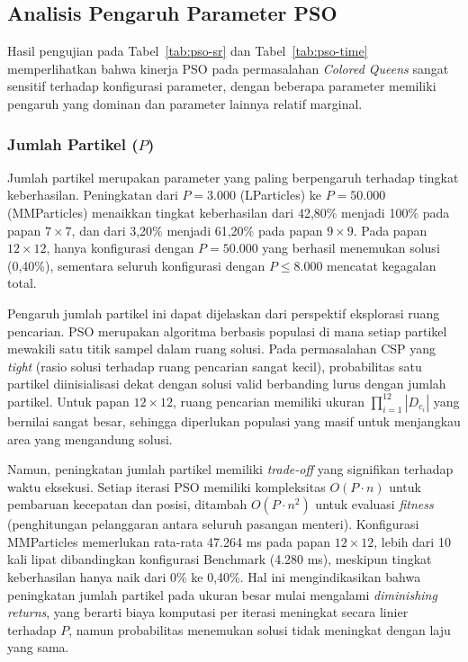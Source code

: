 \subsection{Analisis Pengaruh Parameter PSO}
\label{subsec:analisis-pso}

Hasil pengujian pada Tabel~\ref{tab:pso-sr} dan Tabel~\ref{tab:pso-time} memperlihatkan bahwa kinerja PSO pada permasalahan \textit{Colored Queens} sangat sensitif terhadap konfigurasi parameter, dengan beberapa parameter memiliki pengaruh yang dominan dan parameter lainnya relatif marginal.

\subsubsection{Jumlah Partikel ($P$)}

Jumlah partikel merupakan parameter yang paling berpengaruh terhadap tingkat keberhasilan. Peningkatan dari $P = 3.000$ (LParticles) ke $P = 50.000$ (MMParticles) menaikkan tingkat keberhasilan dari 42,80\% menjadi 100\% pada papan $7 \times 7$, dan dari 3,20\% menjadi 61,20\% pada papan $9 \times 9$. Pada papan $12 \times 12$, hanya konfigurasi dengan $P = 50.000$ yang berhasil menemukan solusi (0,40\%), sementara seluruh konfigurasi dengan $P \leq 8.000$ mencatat kegagalan total.

Pengaruh jumlah partikel ini dapat dijelaskan dari perspektif eksplorasi ruang pencarian. PSO merupakan algoritma berbasis populasi di mana setiap partikel mewakili satu titik sampel dalam ruang solusi. Pada permasalahan CSP yang \textit{tight} (rasio solusi terhadap ruang pencarian sangat kecil), probabilitas satu partikel diinisialisasi dekat dengan solusi valid berbanding lurus dengan jumlah partikel. Untuk papan $12 \times 12$, ruang pencarian memiliki ukuran $\prod_{i=1}^{12} |D_{c_i}|$ yang bernilai sangat besar, sehingga diperlukan populasi yang masif untuk menjangkau area yang mengandung solusi.

\newpage
Namun, peningkatan jumlah partikel memiliki \textit{trade-off} yang signifikan terhadap waktu eksekusi. Setiap iterasi PSO memiliki kompleksitas $O(P \cdot n)$ untuk pembaruan kecepatan dan posisi, ditambah $O(P \cdot n^2)$ untuk evaluasi \textit{fitness} (penghitungan pelanggaran antara seluruh pasangan menteri). Konfigurasi MMParticles memerlukan rata-rata 47.264 ms pada papan $12 \times 12$, lebih dari 10 kali lipat dibandingkan konfigurasi Benchmark (4.280 ms), meskipun tingkat keberhasilan hanya naik dari 0\% ke 0,40\%. Hal ini mengindikasikan bahwa peningkatan jumlah partikel pada ukuran besar mulai mengalami \textit{diminishing returns}, yang berarti biaya komputasi per iterasi meningkat secara linier terhadap $P$, namun probabilitas menemukan solusi tidak meningkat dengan laju yang sama.

